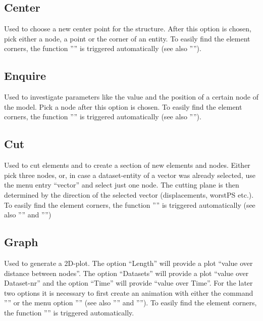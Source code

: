 \documentclass{article}
\begin{document}
\subsection{\label{Center}Center}
Used to choose a new center point for the structure. After this option is chosen, pick either a node, a point or the corner of an entity. To easily find the element corners, the function '''' is triggered automatically (see also '''').

\subsection{\label{Enquire}Enquire}
Used to investigate parameters like the value and the position of a certain node of the model. Pick a node after this option is chosen. To easily find the element corners, the function '''' is triggered automatically (see also '''').

\subsection{\label{Cut}Cut}
Used to cut elements and to create a section of new elements and nodes. Either pick three nodes, or, in case a dataset-entity of a vector was already selected, use the menu entry ``vector'' and select just one node. The cutting plane is then determined by the direction of the selected vector (displacements, worstPS etc.). To easily find the element corners, the function '''' is triggered automatically (see also '''' and '''')

\subsection{\label{Graph}Graph}
Used to generate a 2D-plot. The option ``Length'' will provide a plot ``value over distance between nodes''. The option ``Datasets'' will provide a plot ``value over Dataset-nr'' and the option ``Time'' will provide ``value over Time''. For the later two options it is necessary to first create an animation with either the command '''' or the menu option '''' (see also '''' and ''''). To easily find the element corners, the function '''' is triggered automatically.
\end{document}
